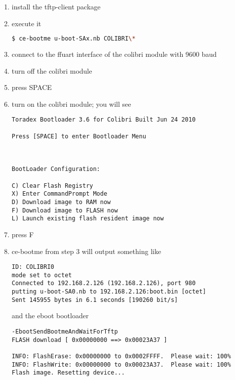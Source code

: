 \begin{enumerate}
\item install the tftp-client package
\item execute it
\begin{lstlisting}[language=sh]
$ ce-bootme u-boot-SAx.nb COLIBRI\*
\end{lstlisting}%

\item connect to the ffuart interface of the colibri module with 9600 baud

\item turn off the colibri module

\item press SPACE

\item turn on the colibri module; you will see

\begin{verbatim}
Toradex Bootloader 3.6 for Colibri Built Jun 24 2010

Press [SPACE] to enter Bootloader Menu



BootLoader Configuration:

C) Clear Flash Registry
X) Enter CommandPrompt Mode
D) Download image to RAM now
F) Download image to FLASH now
L) Launch existing flash resident image now
\end{verbatim}

\item press F

\item ce-bootme from step 3 will output something like
\begin{verbatim}
ID: COLIBRI0
mode set to octet
Connected to 192.168.2.126 (192.168.2.126), port 980
putting u-boot-SA0.nb to 192.168.2.126:boot.bin [octet]
Sent 145955 bytes in 6.1 seconds [190260 bit/s]
\end{verbatim}

     and the eboot bootloader

\begin{verbatim}
-EbootSendBootmeAndWaitForTftp
FLASH download [ 0x00000000 ==> 0x00023A37 ]

INFO: FlashErase: 0x00000000 to 0x0002FFFF.  Please wait: 100%
INFO: FlashWrite: 0x00000000 to 0x00023A37.  Please wait: 100%
Flash image. Resetting device...
\end{verbatim}

\end{enumerate}


